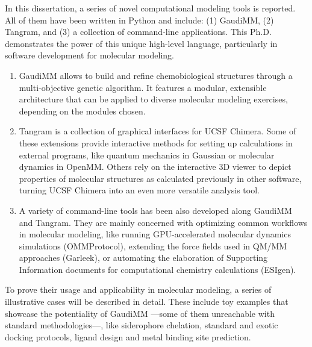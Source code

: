 

In this dissertation, a series of novel computational modeling tools is reported. All of them have been written in Python and include: (1) GaudiMM, (2) Tangram, and (3) a collection of command-line applications. This Ph.D. demonstrates the power of this unique high-level language, particularly in software development for molecular modeling.

\begin{enumerate}
    \item GaudiMM allows to build and refine chemobiological structures through a multi-objective genetic algorithm. It features a modular, extensible architecture that can be applied to diverse molecular modeling exercises, depending on the modules chosen.

    \item Tangram is a collection of graphical interfaces for UCSF Chimera. Some of these extensions provide interactive methods for setting up calculations in external programs, like quantum mechanics in Gaussian or molecular dynamics in OpenMM. Others rely on the interactive 3D viewer to depict properties of molecular structures as calculated previously in other software, turning UCSF Chimera into an even more versatile analysis tool.

    \item A variety of command-line tools has been also developed along GaudiMM and Tangram. They are mainly concerned with optimizing common workflows in molecular modeling, like running GPU-accelerated molecular dynamics simulations (OMMProtocol), extending the force fields used in QM/MM approaches (Garleek), or automating the elaboration of Supporting Information documents for computational chemistry calculations (ESIgen).
\end{enumerate}

To prove their usage and applicability in molecular modeling, a series of illustrative cases will be described in detail. These include toy examples that showcase the potentiality of GaudiMM ---some of them unreachable with standard methodologies---, like siderophore chelation, standard and exotic docking protocols, ligand design and metal binding site prediction.